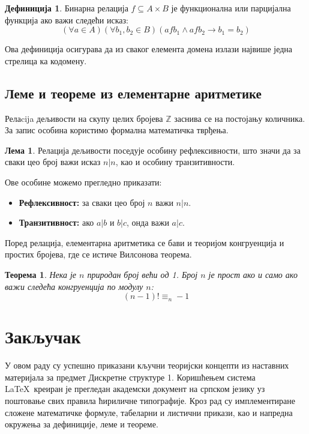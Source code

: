 \documentclass[12pt, a4paper]{article}
\newtheorem{teorema}{Теорема}
\theoremstyle{definition}
\newtheorem{definicija}{Дефиниција}
\newtheorem{lema}{Лема}
\begin{document}
\begin{definicija}
Бинарна релација $f \subseteq A \times B$ је функционална или парцијална функција ако важи следећи исказ:
\begin{equation}
    (\forall a \in A)(\forall b_1, b_2 \in B)(a f b_1 \wedge a f b_2 \rightarrow b_1 = b_2)
\end{equation}
\end{definicija}

Ова дефиниција осигурава да из сваког елемента домена излази највише једна стрелица ка кодомену.

\subsection{Леме и теореме из елементарне аритметике}
Релаcija дељивости на скупу целих бројева $\mathbb{Z}$ заснива се на постојању количника. За запис особина користимо формална математичка тврђења.

\begin{lema}
Релација дељивости поседује особину рефлексивности, што значи да за сваки цео број важи исказ $n|n$, као и особину транзитивности.
\end{lema}
Ове особине можемо прегледно приказати:
\begin{itemize}
    \item \textbf{Рефлексивност:} за сваки цео број $n$ важи $n|n$.
    \item \textbf{Транзитивност:} ако $a|b$ и $b|c$, онда важи $a|c$.
\end{itemize}
Поред релација, елементарна аритметика се бави и теоријом конгруенција и простих бројева, где се истиче Вилсонова теорема.

\begin{teorema}
Нека је $n$ природан број већи од 1. Број $n$ је прост ако и само ако важи следећа конгруенција по модулу $n$:
\begin{equation}
    (n-1)! \equiv_n -1
\end{equation}
\end{teorema}

\section{Закључак}
У овом раду су успешно приказани кључни теоријски концепти из наставних материјала за предмет Дискретне структуре 1. Коришћењем система \LaTeX\ креиран је прегледан академски документ на српском језику уз поштовање свих правила ћириличне типографије. Кроз рад су имплементиране сложене математичке формуле, табеларни и листични прикази, као и напредна окружења за дефиниције, леме и теореме.
\end{document}
